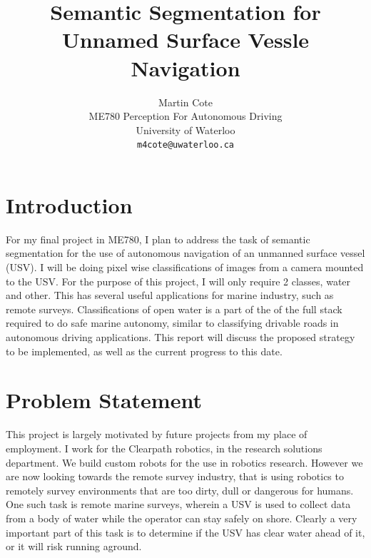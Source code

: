 \documentclass[10pt,twocolumn,letterpaper]{article}
\begin{document}
\title{ Semantic Segmentation for Unnamed Surface Vessle Navigation}

\author{Martin Cote\\
ME780 Perception For Autonomous Driving\\
University of Waterloo\\
{\tt\small m4cote@uwaterloo.ca}
}

\maketitle


\section{Introduction}
For my final project in ME780, I plan to address the task of semantic segmentation
for the use of autonomous navigation of an unmanned surface vessel (USV). I will be 
doing pixel wise classifications of images from a camera mounted to the USV. For the
purpose of this project, I will only require 2 classes, water and other. This has 
several useful applications for marine industry, such as remote surveys. Classifications
of open water is a part of the of the full stack required to do safe marine autonomy,
similar to classifying drivable roads in autonomous driving applications. This report
will discuss the proposed strategy to be implemented, as well as the current progress 
to this date.


\section{Problem Statement }
This project is largely motivated by future projects from my place of employment.
I work for the Clearpath robotics, in the research solutions department. We build 
custom robots for the use in robotics research. However we are now looking
towards the remote survey industry, that is using robotics to remotely survey
environments that are too dirty, dull or dangerous for humans. One such task is 
remote marine surveys, wherein a USV is used to collect data from a body of water
while the operator can stay safely on shore. Clearly a very important part of this
task is to determine if the USV has clear water ahead of it, or it will risk 
running aground.
\end{document}
